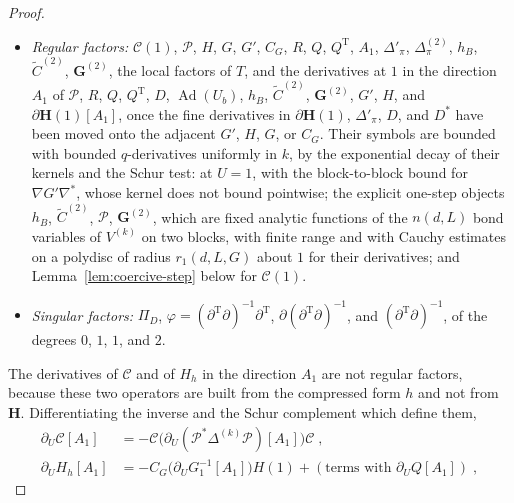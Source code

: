 \documentclass[11pt]{preprint}
\numberwithin{equation}{section}
\theoremstyle{definition}
\theoremstyle{remark}
\theoremstyle{plain}
\begin{document}
\begin{proof}
\begin{itemize}
\item \emph{Regular factors:} $\mathcal C(1)$, $\mathcal P$, $H$, $G$, $G'$, $C_G$, $R$, $Q$, $Q^{\mathrm T}$, $A_1$, $\Delta'_\pi$, $\Delta^{(2)}_\pi$, $h_B$, $\tilde C^{(2)}$, $\mathbf G^{(2)}$, the local factors of $T$, and the derivatives at $1$ in the direction $A_1$ of $\mathcal P$, $R$, $Q$, $Q^{\mathrm T}$, $D$, $\operatorname{Ad}(U_b)$, $h_B$, $\tilde C^{(2)}$, $\mathbf G^{(2)}$, $G'$, $H$, and $\partial\mathbf H(1)[A_1]$, once the fine derivatives in $\partial\mathbf H(1)$, $\Delta'_\pi$, $D$, and $D^*$ have been moved onto the adjacent $G'$, $H$, $G$, or $C_G$. Their symbols are bounded with bounded $q$-derivatives uniformly in $k$, by the exponential decay of their kernels and the Schur test: \cite[Theorems~3.1--3.3, 3.12, (3.131)--(3.133), pp.~397--422]{BalabanPBG} at $U = 1$, with the block-to-block bound \cite[(3.46), p.~398]{BalabanPBG} for $\nabla G'\nabla^*$, whose kernel \cite[p.~423]{BalabanPBG} does not bound pointwise; the explicit one-step objects $h_B$, $\tilde C^{(2)}$, $\mathcal P$, $\mathbf G^{(2)}$, which are fixed analytic functions of the $n(d, L)$ bond variables of $V^{(k)}$ on two blocks, with finite range and with Cauchy estimates on a polydisc of radius $r_1(d, L, G)$ about $1$ for their derivatives; and Lemma~\ref{lem:coercive-step} below for $\mathcal C(1)$.
\item \emph{Singular factors:} $\Pi_D$, $\varphi = (\partial^{\mathrm T}\partial)^{-1}\partial^{\mathrm T}$, $\partial(\partial^{\mathrm T}\partial)^{-1}$, and $(\partial^{\mathrm T}\partial)^{-1}$, of the degrees $0$, $1$, $1$, and $2$.
\end{itemize}
The derivatives of $\mathcal C$ and of $H_h$ in the direction $A_1$ are not regular factors, because these two operators are built from the compressed form $h$ and not from $\mathbf H$. Differentiating the inverse and the Schur complement which define them,
\begin{align*}
    \partial_U\mathcal C[A_1] &= -\mathcal C\bigl(\partial_U(\mathcal P^*\Delta^{(k)}\mathcal P)[A_1]\bigr)\mathcal C\;,\\
    \partial_UH_h[A_1] &= -C_G\bigl(\partial_UG_1^{-1}[A_1]\bigr)H(1) + (\text{terms with } \partial_UQ[A_1])\;,
\end{align*}

\end{proof}
\end{document}
